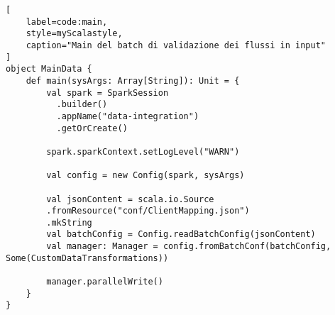 \begin{lstlisting}[
    label=code:main,
    style=myScalastyle,
    caption="Main del batch di validazione dei flussi in input"
]
object MainData {
    def main(sysArgs: Array[String]): Unit = {
        val spark = SparkSession
          .builder()
          .appName("data-integration")
          .getOrCreate()

        spark.sparkContext.setLogLevel("WARN")

        val config = new Config(spark, sysArgs)

        val jsonContent = scala.io.Source
        .fromResource("conf/ClientMapping.json")
        .mkString
        val batchConfig = Config.readBatchConfig(jsonContent)
        val manager: Manager = config.fromBatchConf(batchConfig, Some(CustomDataTransformations))

        manager.parallelWrite()
    }
}
\end{lstlisting}